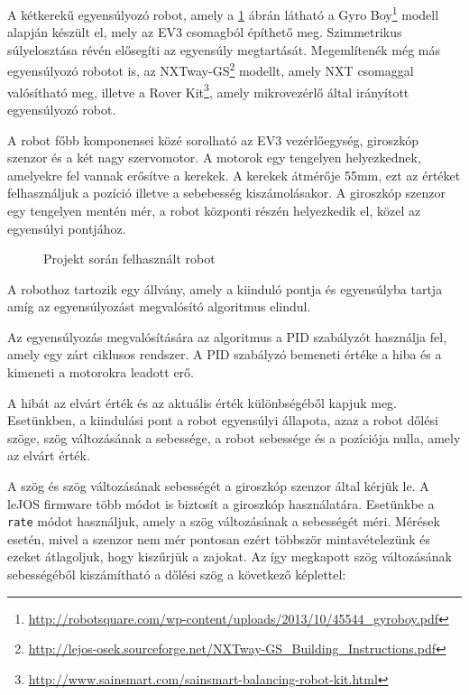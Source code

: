 A kétkerekű egyensúlyozó robot, amely a \ref{fig:gyro_boy} ábrán látható a Gyro Boy\footnote{\href{http://robotsquare.com/wp-content/uploads/2013/10/45544\_gyroboy.pdf}{http://robotsquare.com/wp-content/uploads/2013/10/45544\_gyroboy.pdf}} modell alapján készült el, mely az EV3 csomagból építhető meg. Szimmetrikus súlyelosztása révén elősegíti az egyensúly megtartását. Megemlítenék még más egyensúlyozó robotot is, az NXTway-GS\footnote{\href{http://lejos-osek.sourceforge.net/NXTway-GS\_Building\_Instructions.pdf}{http://lejos-osek.sourceforge.net/NXTway-GS\_Building\_Instructions.pdf}} modellt, amely NXT csomaggal valósítható meg, illetve a Rover Kit\footnote{\href{http://www.sainsmart.com/sainsmart-balancing-robot-kit.html}{http://www.sainsmart.com/sainsmart-balancing-robot-kit.html}}, amely mikrovezérlő által irányított egyensúlyozó robot.

A robot főbb komponensei közé sorolható az EV3 vezérlőegység, giroszkóp szenzor és a két nagy szervomotor. A motorok egy tengelyen helyezkednek, amelyekre fel vannak erősítve a kerekek. A kerekek átmérője 55mm, ezt az értéket felhasználjuk a pozíció illetve a sebebesség kiszámolásakor. A giroszkóp szenzor egy tengelyen mentén mér, a robot központi részén helyezkedik el, közel az egyensúlyi pontjához.

\begin{figure}[!htb]
	\centering
	\caption{Projekt során felhasznált robot}
	\label{fig:gyro_boy}
\end{figure}

A robothoz tartozik egy állvány, amely a kiinduló pontja és egyensúlyba tartja amíg az egyensúlyozást megvalósító algoritmus elindul. 

Az egyensúlyozás megvalósítására az algoritmus a PID szabályzót használja fel, amely egy zárt ciklusos rendszer. A PID szabályzó bemeneti értéke a hiba és a kimeneti a motorokra leadott erő.

A hibát az elvárt érték és az aktuális érték különbségéből kapjuk meg. Esetünkben, a kiindulási pont a robot egyensúlyi állapota, azaz a robot dőlési szöge, szög változásának a sebessége, a robot sebessége és a pozíciója nulla, amely az elvárt érték. 

A szög és szög változásának sebességét a giroszkóp szenzor által kérjük le. A leJOS firmware több módot is biztosít a giroszkóp használatára. Esetünkbe a \texttt{rate} módot használjuk, amely a szög változásának a sebességét méri. Mérések esetén, mivel a szenzor nem mér pontosan ezért többször mintavételezünk és ezeket átlagoljuk, hogy kiszűrjük a zajokat. Az így megkapott szög változásának sebességéből kiszámítható a dőlési szög a következő képlettel: 

